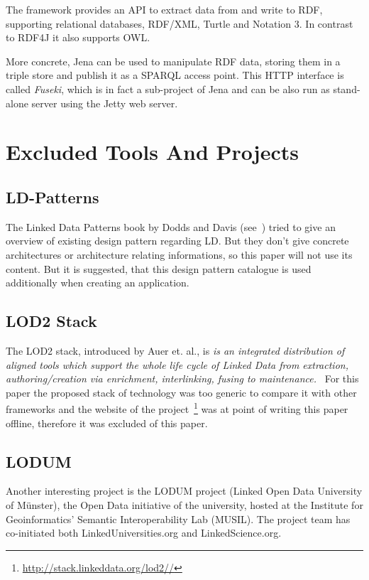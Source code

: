 The framework provides an API to extract data from and write to RDF, supporting relational databases, RDF/XML, Turtle and Notation 3. In contrast to RDF4J it also supports OWL.

More concrete, Jena can be used to manipulate RDF data, storing them in a triple store and publish it as a SPARQL access point. This HTTP interface is called \emph{Fuseki}, which is in fact a sub-project of Jena and can be also run as stand-alone server using the Jetty web server.

\newpage
\section{Excluded Tools And Projects}\label{excluded}

\subsection{LD-Patterns}
The Linked Data Patterns book by Dodds and Davis (see~\cite{dodds2011linked}) tried to give an overview of existing design pattern regarding LD. But they don't give concrete architectures or architecture relating informations, so this paper will not use its content. But it is suggested, that this design pattern catalogue is used additionally when creating an application.

\subsection{LOD2 Stack}

The LOD2 stack, introduced by Auer et. al., is \emph{is an integrated distribution of aligned tools which support the whole life cycle of Linked Data from extraction, authoring/creation via enrichment, interlinking, fusing to maintenance.}~\cite{auer2012managing} For this paper the proposed stack of technology was too generic to compare it with other frameworks and the website of the project~\footnote{\url{http://stack.linkeddata.org/lod2//}} was at point of writing this paper offline, therefore it was excluded of this paper.

\subsection{LODUM}

Another interesting project is the LODUM project (Linked Open Data University of Münster), the Open Data initiative of the university, hosted at the Institute for Geoinformatics' Semantic Interoperability Lab (MUSIL). The project team has co-initiated both LinkedUniversities.org and LinkedScience.org.

